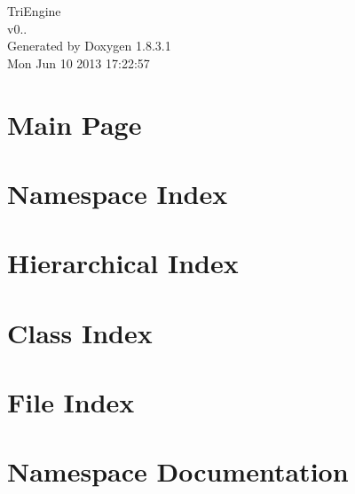 \documentclass{book}
\begin{document}
\hypersetup{pageanchor=false,citecolor=blue}
\begin{titlepage}
\vspace*{7cm}
\begin{center}
{\Large Tri\-Engine \\[1ex]\large v0.. }\\
\vspace*{1cm}
{\large Generated by Doxygen 1.8.3.1}\\
\vspace*{0.5cm}
{\small Mon Jun 10 2013 17:22:57}\\
\end{center}
\end{titlepage}
\clearemptydoublepage
{}
\tableofcontents
\clearemptydoublepage
{}
\hypersetup{pageanchor=true,citecolor=blue}
\chapter{Main Page}
\label{index}\hypertarget{index}{}
\chapter{Namespace Index}

\chapter{Hierarchical Index}

\chapter{Class Index}

\chapter{File Index}

\chapter{Namespace Documentation}






















\end{document}
